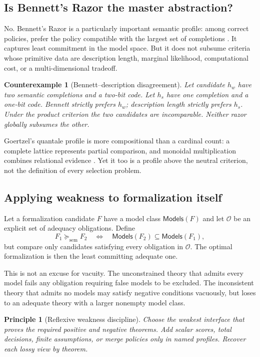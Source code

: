 \documentclass[11pt]{article}
\newtheorem{counterexample}[definition]{Counterexample}
\newtheorem{principle}[definition]{Principle}
\theoremstyle{remark}
\newcommand{\Models}{\mathsf{Models}}
\begin{document}
\subsection{Is Bennett's Razor the master abstraction?}

No.  Bennett's Razor is a particularly important semantic profile: among
correct policies, prefer the policy compatible with the largest set of
completions \cite{bennett2023,bennett2024}.  It captures least commitment in
the model space.  But it does not subsume criteria whose primitive data are
description length, marginal likelihood, computational cost, or a
multi-dimensional tradeoff.

\begin{counterexample}[Bennett--description disagreement]
Let candidate $h_w$ have two semantic completions and a two-bit code.  Let
$h_s$ have one completion and a one-bit code.  Bennett strictly prefers $h_w$;
description length strictly prefers $h_s$.  Under the product criterion the
two candidates are incomparable.  Neither razor globally subsumes the other.
\end{counterexample}

Goertzel's quantale profile is more compositional than a cardinal count: a
complete lattice represents partial comparison, and monoidal multiplication
combines relational evidence \cite{goertzelweakness}.  Yet it too is a profile
above the neutral criterion, not the definition of every selection problem.

\subsection{Applying weakness to formalization itself}

Let a formalization candidate $F$ have a model class $\Models(F)$ and let
$\mathcal O$ be an explicit set of adequacy obligations.  Define
\[
  F_1 \succeq_{\mathrm{sem}} F_2
  \quad\Longleftrightarrow\quad
  \Models(F_2)\subseteq\Models(F_1),
\]
but compare only candidates satisfying every obligation in $\mathcal O$.
The optimal formalization is then the least committing adequate one.

This is not an excuse for vacuity.  The unconstrained theory that admits every
model fails any obligation requiring false models to be excluded.  The
inconsistent theory that admits no models may satisfy negative conditions
vacuously, but loses to an adequate theory with a larger nonempty model class.

\begin{principle}[Reflexive weakness discipline]
Choose the weakest interface that proves the required positive and negative
theorems.  Add scalar scores, total decisions, finite assumptions, or merge
policies only in named profiles.  Recover each lossy view by theorem.
\end{principle}
\end{document}
